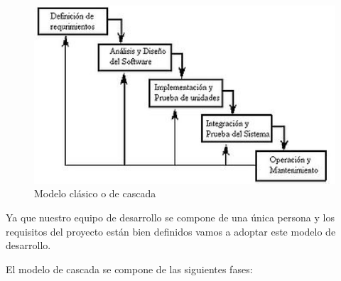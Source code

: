 \begin{figure}[!h]
  \begin{center}
  \includegraphics[width=1\textwidth]{../images/modelo_cascada.jpg}
  \caption[Modelo cascada]{ Modelo clásico o de cascada }
  \label{fig:modelo_cascada}
  \end{center}
\end{figure}


\bigskip
Ya que nuestro equipo de desarrollo se compone de una única persona y los requisitos del proyecto están bien definidos vamos a adoptar este modelo de desarrollo.


\bigskip
El modelo de cascada se compone de las siguientes fases:

